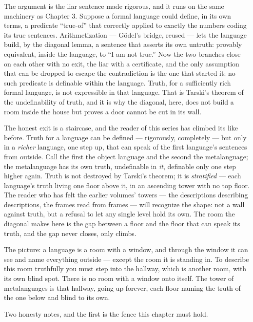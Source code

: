 The argument is the liar sentence made rigorous, and it runs on the same
machinery as Chapter 3. Suppose a formal language could define, in its own
terms, a predicate ``true-of'' that correctly applied to exactly the
numbers coding its true sentences. Arithmetization --- G\"odel's bridge,
reused --- lets the language build, by the diagonal lemma, a sentence that
asserts its own untruth: provably equivalent, inside the language, to
``I am not true.'' Now the two branches close on each other with no exit,
the liar with a certificate, and the only assumption that can be dropped
to escape the contradiction is the one that started it: no such predicate
is definable within the language. Truth, for a sufficiently rich formal
language, is not expressible in that language. That is Tarski's theorem of
the undefinability of truth, and it is why the diagonal, here, does not
build a room inside the house but proves a door cannot be cut in its wall.

The honest exit is a staircase, and the reader of this series has climbed
its like before. Truth for a language can be defined --- rigorously,
completely --- but only in a \emph{richer} language, one step up, that can
speak of the first language's sentences from outside. Call the first the
object language and the second the metalanguage; the metalanguage has its
own truth, undefinable in \emph{it}, definable only one step higher again.
Truth is not destroyed by Tarski's theorem; it is \emph{stratified} ---
each language's truth living one floor above it, in an ascending tower
with no top floor. The reader who has felt the earlier volumes' towers ---
the descriptions describing descriptions, the frames read from frames ---
will recognize the shape: not a wall against truth, but a refusal to let
any single level hold its own. The room the diagonal makes here is the
gap between a floor and the floor that can speak its truth, and the gap
never closes, only climbs.

\begin{intuition}
The picture: a language is a room with a window, and through the window it
can see and name everything outside --- except the room it is standing in.
To describe this room truthfully you must step into the hallway, which is
another room, with its own blind spot. There is no room with a window onto
itself. The tower of metalanguages is that hallway, going up forever, each
floor naming the truth of the one below and blind to its own.
\end{intuition}

Two honesty notes, and the first is the fence this chapter must hold.

